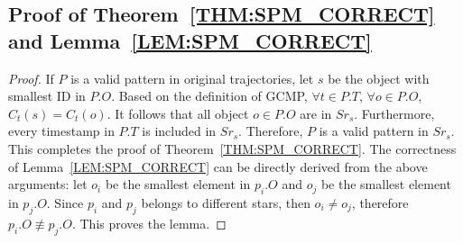\subsection{Proof of Theorem~\ref{THM:SPM_CORRECT} and Lemma~\ref{LEM:SPM_CORRECT}}
\begin{proof}
If $P$ is a valid pattern in original trajectories, 
let $s$ be the object with smallest ID in $P.O$. 
Based on the definition of GCMP, $\forall t \in P.T$, $\forall o \in P.O$, $C_t(s) = C_t(o)$.
It follows that all object $o \in P.O$ are in $Sr_s$. 
Furthermore, every timestamp in $P.T$ is included
in $Sr_s$. Therefore, $P$ is a valid pattern in $Sr_s$. This completes the proof of Theorem~\ref{THM:SPM_CORRECT}.
The correctness of Lemma~\ref{LEM:SPM_CORRECT} can be directly derived from the above arguments:
let $o_i$ be the smallest element in $p_i.O$ and $o_j$ be the smallest element in $p_j.O$. 
Since $p_i$ and $p_j$ belongs to different stars, then $o_i \neq o_j$, 
therefore $p_i.O \not\equiv p_j.O$. This proves the lemma.
\end{proof}

